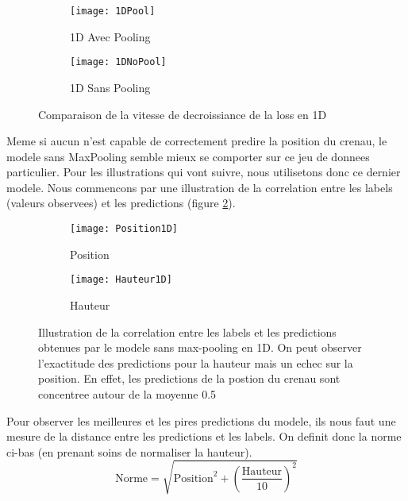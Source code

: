     \begin{figure}[!h]
    \begin{subfigure}{.5\textwidth}
    \centering
    \texttt{[image: 1DPool]}  
    \caption[2DPool]{1D Avec Pooling}
    \end{subfigure}
    \begin{subfigure}{.5\textwidth}
    \centering
    \texttt{[image: 1DNoPool]}  
    \caption[2DNoPool]{1D Sans Pooling}
    \end{subfigure}
    \label{fig:1DLoss}

    \centering
    \decoRule
    \caption[Loss 1D]{Comparaison de la vitesse de decroissiance de la loss en 1D}
    \end{figure}

    Meme si aucun n'est capable de correctement predire la position du crenau, le modele sans MaxPooling semble mieux se comporter sur ce jeu de donnees particulier. Pour les illustrations qui vont suivre, nous utilisetons donc ce dernier modele. Nous commencons par une illustration de la correlation entre les labels (valeurs observees) et les predictions (figure \ref{fig:Illustration1D}).
    
    \begin{figure}[!h]
    \begin{subfigure}{.5\textwidth}
    \centering
    \texttt{[image: Position1D]}  
    \caption[Pos1D]{Position}
    \end{subfigure}
    \begin{subfigure}{.5\textwidth}
    \centering
    \texttt{[image: Hauteur1D]}  
    \caption[H1D]{Hauteur}
    \end{subfigure}
    
     \centering
    \decoRule
    \caption[Illustration 1D]{Illustration de la correlation entre les labels et les predictions obtenues par le modele sans max-pooling en 1D. On peut observer l'exactitude des predictions pour la hauteur mais un echec sur la position. En effet, les predictions de la postion du crenau sont concentree autour de la moyenne 0.5}
    \label{fig:Illustration1D}
    \end{figure}

    Pour observer les meilleures et les pires predictions du modele, ils nous faut une mesure de la distance entre les predictions et les labels. On definit donc la norme ci-bas (en prenant soins de normaliser la hauteur). $$ \text{Norme} = \sqrt{\text{Position}^2 + \left( \frac{\text{Hauteur}}{10} \right)^2}$$
    
